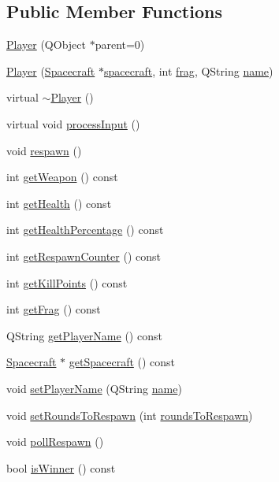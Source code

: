 \subsection*{Public Member Functions}
\begin{DoxyCompactItemize}
\item 
\hyperlink{class_player_a5c2a46dbacbc28b7cfbe352b6c0db644}{Player} (Q\+Object $\ast$parent=0)
\item 
\hyperlink{class_player_af4f9da1b1dcb53008b915a83480c79c7}{Player} (\hyperlink{class_spacecraft}{Spacecraft} $\ast$\hyperlink{class_player_a7cc88a054d2329b1ca7472a86b2030ca}{spacecraft}, int \hyperlink{class_player_a9528a6db252f2fe947fd7d9189837aec}{frag}, Q\+String \hyperlink{class_player_ac41b72814d9c41222dac999bc874280b}{name})
\item 
virtual \hyperlink{class_player_a749d2c00e1fe0f5c2746f7505a58c062}{$\sim$\+Player} ()
\item 
virtual void \hyperlink{class_player_ab8afa8b779cc8b9defcb232e8365d556}{process\+Input} ()
\item 
void \hyperlink{class_player_a038a74bd768b6eec8fbe57cb2bacf811}{respawn} ()
\item 
int \hyperlink{class_player_a3cef8ef0611782172327688ed90e384c}{get\+Weapon} () const 
\item 
int \hyperlink{class_player_a3042adb49808b2629137f4d85b6b5fd3}{get\+Health} () const 
\item 
int \hyperlink{class_player_a9f08c60ca4a4eae56edfc4bbadd63cef}{get\+Health\+Percentage} () const 
\item 
int \hyperlink{class_player_ae3fa0766b5a82c905b7c5e48fc5a9c8c}{get\+Respawn\+Counter} () const 
\item 
int \hyperlink{class_player_ae8e78a997352c717189cb5379fd9e70a}{get\+Kill\+Points} () const 
\item 
int \hyperlink{class_player_a706d0a53dbdf713727d67123d1b05df5}{get\+Frag} () const 
\item 
Q\+String \hyperlink{class_player_a978a40d6cca433896cc4ea63cb55b596}{get\+Player\+Name} () const 
\item 
\hyperlink{class_spacecraft}{Spacecraft} $\ast$ \hyperlink{class_player_a3e2f165ad67adec865a4a4a9bfb23463}{get\+Spacecraft} () const 
\item 
void \hyperlink{class_player_a88887d3b662e42909bdd0d5d19898935}{set\+Player\+Name} (Q\+String \hyperlink{class_player_ac41b72814d9c41222dac999bc874280b}{name})
\item 
void \hyperlink{class_player_a083c1b12bc175c6226666be2c93b95ef}{set\+Rounds\+To\+Respawn} (int \hyperlink{class_player_a205c4499cffb2d684d5ff48dd1713d11}{rounds\+To\+Respawn})
\item 
void \hyperlink{class_player_a98fe6e2e7fa090a26a0afafb647e9710}{poll\+Respawn} ()
\item 
bool \hyperlink{class_player_a3827333b1bd0af0be428c6e1e03df24f}{is\+Winner} () const 
\end{DoxyCompactItemize}
